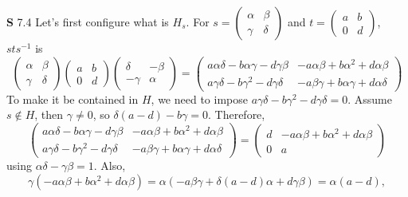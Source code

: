 \documentclass[a4paper, 12pt]{article}
\theoremstyle{Mydefinition}
\theoremstyle{Mytheorem}
\begin{document}
\noindent \textbf{S} 7.4
    Let's first configure what is $H_s$. For $s = \begin{pmatrix}\alpha & \beta\\ \gamma & \delta
    \end{pmatrix}$ and $t = \begin{pmatrix}
    a & b\\ 0 & d
    \end{pmatrix}$, $sts^{-1}$ is
\begin{equation}
    \begin{pmatrix}
    \alpha & \beta\\
    \gamma & \delta
    \end{pmatrix}\begin{pmatrix}
    a & b \\ 0 & d
    \end{pmatrix}\begin{pmatrix}
    \delta & -\beta\\
    -\gamma & \alpha
    \end{pmatrix} = \begin{pmatrix}
    a\alpha\delta - b\alpha\gamma - d\gamma\beta & -a\alpha\beta + b\alpha^2+d\alpha\beta\\
    a\gamma\delta - b\gamma^2 - d\gamma\delta & -a\beta\gamma + b\alpha\gamma + d\alpha\delta
    \end{pmatrix}
\end{equation}
To make it be contained in $H$, we need to impose $a\gamma\delta - b\gamma^2 - d\gamma\delta = 0$. Assume $s\not\in H$, then $\gamma\neq 0$, so $\delta(a-d)-b\gamma = 0$. Therefore,
\begin{equation}
    \begin{pmatrix}
    a\alpha\delta - b\alpha\gamma - d\gamma\beta & -a\alpha\beta + b\alpha^2+d\alpha\beta\\
    a\gamma\delta - b\gamma^2 - d\gamma\delta & -a\beta\gamma + b\alpha\gamma + d\alpha\delta
    \end{pmatrix} = \begin{pmatrix}
    d & -a\alpha\beta + b\alpha^2+d\alpha\beta\\
    0 & a
    \end{pmatrix}
\end{equation}
using $\alpha\delta-\gamma\beta = 1$. Also,
\begin{equation}
    \gamma(-a\alpha\beta + b\alpha^2+d\alpha\beta) = \alpha(-a\beta\gamma + \delta(a-d)\alpha + d\gamma\beta) = \alpha(a-d),
\end{equation}
\end{document}
